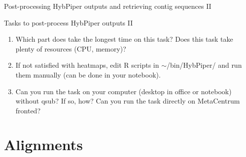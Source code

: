 \documentclass[compress, ucs, xelatex, 11pt, xcolor=x11names, aspectratio=1609,
	hyperref={
		bookmarks=true,
		unicode=true,
		colorlinks=true,
		pdftitle={HybSeq course},
		plainpages=false,
		pdfauthor={Vojtech Zeisek},
		pdfsubject={Practical processing of HybSeq target enrichment sequencing data on computing grids like MetaCentrum},
		pdfcreator={XeLaTeX},
		pdfkeywords={BASH, command line, GNU, HybSeq, Linux, MetaCentrum, sequencing shell, target enrichment},
		linkcolor=Cyan2, %
		anchorcolor=Firebrick2, %
		citecolor=Firebrick2, %
		filecolor=Firebrick2, %
		menucolor=Firebrick2, %
		urlcolor=Chartreuse2, %
		pdftex},
	url={hyphens, lowtilde} %
	]{beamer}
\renewcommand{\texttt}[1]{\colorbox{Snow4}{{\ttfamily #1}}}
\begin{document}
\begin{frame}{Post-processing HybPiper outputs and retrieving contig sequences II}
	\begin{exampleblock}{Tasks to post-process HybPiper outputs II}
		\begin{enumerate}
			\item Which part does take the longest time on this task? Does this task take plenty of resources (CPU, memory)?
			\item If not satisfied with heatmaps, edit \texttt{R} scripts in \texttt{$\sim$/bin/HybPiper/} and run them manually (can be done in your notebook).
			\item Can you run the task on your computer (desktop in office or notebook) without \texttt{qsub}? If so, how? Can you run the task directly on MetaCentrum fronted?
		\end{enumerate}
	\end{exampleblock}
\end{frame}

\section{Alignments}
\end{document}
